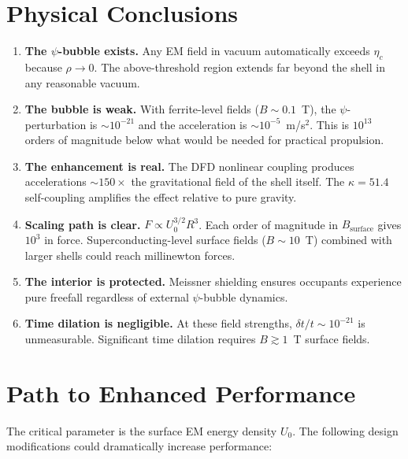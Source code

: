 \documentclass[amsmath,amssymb,aps,prd,superscriptaddress,nofootinbib]{revtex4-2}
\begin{document}
\section{Physical Conclusions}

\begin{enumerate}
\item \textbf{The $\psi$-bubble exists.} Any EM field in vacuum automatically
  exceeds $\eta_c$ because $\rho \to 0$. The above-threshold region extends
  far beyond the shell in any reasonable vacuum.

\item \textbf{The bubble is weak.} With ferrite-level fields ($B \sim 0.1$~T),
  the $\psi$-perturbation is $\sim 10^{-21}$ and the acceleration is
  $\sim 10^{-5}$~m/s$^2$. This is $10^{13}$ orders of magnitude below what
  would be needed for practical propulsion.

\item \textbf{The enhancement is real.} The DFD nonlinear coupling produces
  accelerations $\sim 150\times$ the gravitational field of the shell
  itself. The $\kappa = 51.4$ self-coupling amplifies the effect relative
  to pure gravity.

\item \textbf{Scaling path is clear.} $F \propto U_0^{3/2} R^3$. Each
  order of magnitude in $B_\text{surface}$ gives $10^3$ in force.
  Superconducting-level surface fields ($B \sim 10$~T) combined with
  larger shells could reach millinewton forces.

\item \textbf{The interior is protected.} Meissner shielding ensures
  occupants experience pure freefall regardless of external $\psi$-bubble
  dynamics.

\item \textbf{Time dilation is negligible.} At these field strengths,
  $\delta t / t \sim 10^{-21}$ is unmeasurable. Significant time
  dilation requires $B \gtrsim 1$~T surface fields.
\end{enumerate}

\section{Path to Enhanced Performance}

The critical parameter is the surface EM energy density $U_0$. The
following design modifications could dramatically increase performance:
\end{document}
